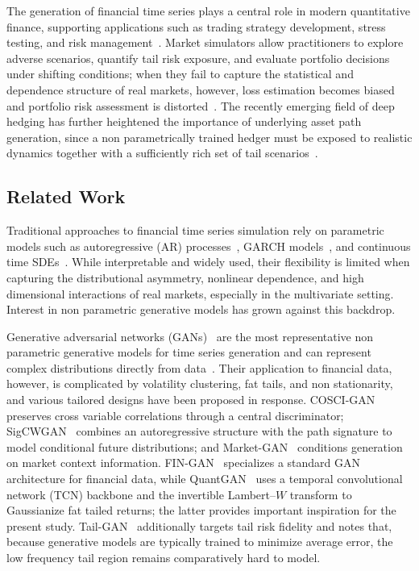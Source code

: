 \documentclass[sigconf,natbib=false]{acmart}
\begin{document}
The generation of financial time series plays a central role in modern quantitative finance, supporting applications such as trading strategy development, stress testing, and risk management~\cite{chan2015simulation, glasserman2004monte, taylor2008modelling}. Market simulators allow practitioners to explore adverse scenarios, quantify tail risk exposure, and evaluate portfolio decisions under shifting conditions; when they fail to capture the statistical and dependence structure of real markets, however, loss estimation becomes biased and portfolio risk assessment is distorted~\cite{Cont26}. The recently emerging field of deep hedging has further heightened the importance of underlying asset path generation, since a non parametrically trained hedger must be exposed to realistic dynamics together with a sufficiently rich set of tail scenarios~\cite{buehler2021deep}.

\subsection{Related Work}

Traditional approaches to financial time series simulation rely on parametric models such as autoregressive (AR) processes~\cite{AR-model-2005}, GARCH models~\cite{GARCH}, and continuous time SDEs~\cite{SDE-1998}. While interpretable and widely used, their flexibility is limited when capturing the distributional asymmetry, nonlinear dependence, and high dimensional interactions of real markets, especially in the multivariate setting. Interest in non parametric generative models has grown against this backdrop.

Generative adversarial networks (GANs)~\cite{GAN} are the most representative non parametric generative models for time series generation and can represent complex distributions directly from data~\cite{GAN_simulation_1, GAN_simulation_2, GAN_simulation_3}. Their application to financial data, however, is complicated by volatility clustering, fat tails, and non stationarity, and various tailored designs have been proposed in response. COSCI-GAN~\cite{COSCI-GAN} preserves cross variable correlations through a central discriminator; SigCWGAN~\cite{SigCWGAN} combines an autoregressive structure with the path signature to model conditional future distributions; and Market-GAN~\cite{Market-GAN} conditions generation on market context information. FIN-GAN~\cite{fin-gan} specializes a standard GAN architecture for financial data, while QuantGAN~\cite{QuantGAN} uses a temporal convolutional network (TCN) backbone and the invertible Lambert--$W$ transform to Gaussianize fat tailed returns; the latter provides important inspiration for the present study. Tail-GAN~\cite{Cont26} additionally targets tail risk fidelity and notes that, because generative models are typically trained to minimize average error, the low frequency tail region remains comparatively hard to model.
\end{document}
